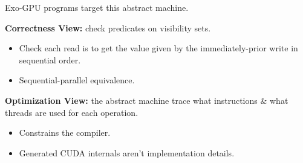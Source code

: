 {\LARGE
Exo-GPU programs target this abstract machine.

\textbf{Correctness View:} check predicates on visibility sets.
\begin{itemize}
  \item Check each read is  to get the value given by the immediately-prior write in sequential order.
  \item Sequential-parallel equivalence.
\end{itemize}

\textbf{Optimization View:} the abstract machine trace  what instructions \& what threads are used for each operation.
\begin{itemize}
  \item Constrains the compiler.
  \item Generated CUDA internals aren't implementation details.
\end{itemize}

}

















